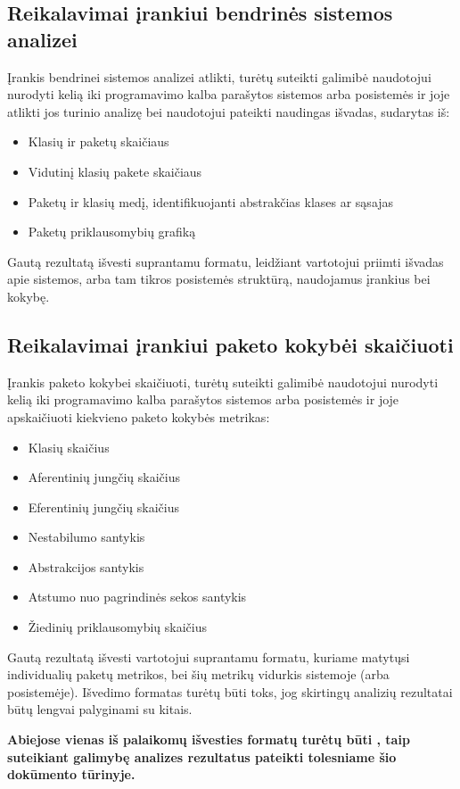 \subsection{Reikalavimai įrankiui bendrinės sistemos analizei}
Įrankis bendrinei sistemos analizei atlikti, turėtų suteikti galimibė naudotojui nurodyti kelią iki  programavimo kalba parašytos sistemos arba posistemės ir joje
atlikti jos turinio analizę bei naudotojui pateikti naudingas išvadas, sudarytas iš:
\begin{itemize}
    \item Klasių ir paketų skaičiaus
    \item Vidutinį klasių pakete skaičiaus
    \item Paketų ir klasių medį, identifikuojanti abstrakčias klases ar sąsajas
    \item Paketų priklausomybių grafiką
\end{itemize}
Gautą rezultatą išvesti suprantamu formatu, leidžiant vartotojui priimti išvadas apie sistemos, arba tam tikros
posistemės struktūrą, naudojamus įrankius bei kokybę.

\subsection{Reikalavimai įrankiui paketo kokybėi skaičiuoti}
Įrankis paketo kokybei skaičiuoti, turėtų suteikti galimibė naudotojui nurodyti kelią iki  programavimo kalba parašytos sistemos arba posistemės ir joje
apskaičiuoti kiekvieno paketo kokybės metrikas:
\begin{itemize}
    \item Klasių skaičius
    \item Aferentinių jungčių skaičius
    \item Eferentinių jungčių skaičius
    \item Nestabilumo santykis
    \item Abstrakcijos santykis
    \item Atstumo nuo pagrindinės sekos santykis
    \item Žiedinių priklausomybių skaičius
\end{itemize}
Gautą rezultatą išvesti vartotojui suprantamu formatu, kuriame matytųsi individualių paketų metrikos, bei šių metrikų vidurkis sistemoje (arba posistemėje).
Išvedimo formatas turėtų būti toks, jog skirtingų analizių rezultatai būtų lengvai palyginami su kitais.

\textbf{Abiejose vienas iš palaikomų išvesties formatų turėtų būti , taip suteikiant galimybę analizes rezultatus pateikti tolesniame šio dokūmento tūrinyje.}

